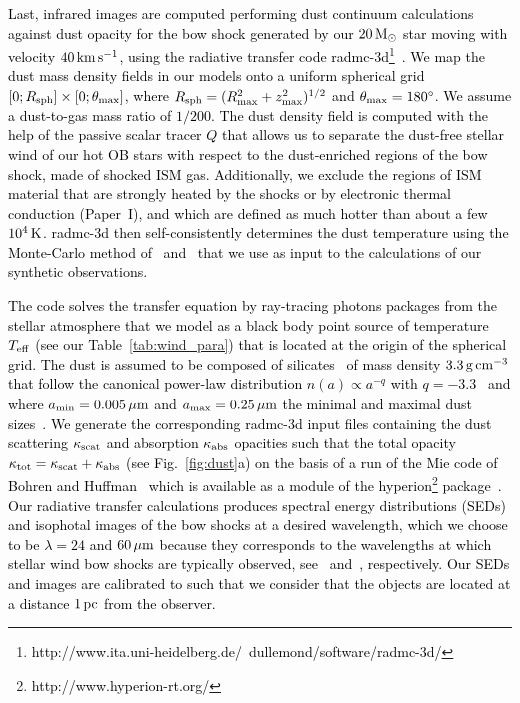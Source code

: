 \documentclass[useAMS,usenatbib]{mn2e}
\newcommand{\degree}{\ensuremath{^\circ}}
\begin{document}
\textcolor{black}{
Last, infrared images are computed performing dust continuum calculations 
against dust opacity for the bow shock generated by our $20\, \rm M_{\odot}$ 
star moving with velocity $40\, \rm km\, \rm s^{-1}$,  using 
the radiative transfer code {\sc radmc-3d}\footnote{ 
\textcolor{black}{http://www.ita.uni-heidelberg.de/~dullemond/software/radmc-3d/} 
}~\citep{ dullemond_2012}. We map the dust mass density fields in our models 
onto a uniform spherical grid $[0;R_{\rm sph}]\times[0; \theta_{\rm max}]$, 
where $R_{\rm sph}=(R_{\rm max}^{2}+z_{\rm max}^{2})^{1/2}$ and $\theta_{\rm 
max}=180\degree$. We assume a dust-to-gas mass ratio of $1/200$. The 
dust density field is computed with the help of the passive 
scalar tracer $Q$ that allows us to separate the dust-free stellar wind of our 
hot OB stars with respect to the dust-enriched regions of the bow shock, made of 
shocked ISM gas. Additionally, we 
exclude the regions of ISM material that are strongly heated by the shocks 
or by electronic thermal conduction (Paper~I), and which are defined as much hotter 
than about a few $10^{4}\, \rm K$. {\sc radmc-3d} then self-consistently 
determines the dust temperature using the Monte-Carlo 
method of~\citet{bjorkman_paj_554_2001} and~\citet{lucy_aa_344_1999} that we use 
as input to the calculations of our synthetic observations.
}




\textcolor{black}{
The code solves the transfer equation by ray-tracing photons packages from the
stellar atmosphere that we model as a black body point source of temperature
$T_{\rm eff}$ (see our Table~\ref{tab:wind_para}) that is located at the origin of
the spherical grid. The dust is assumed to be composed of
silicates~\citep{draine_apj_285_1984} of mass density $3.3\, \rm g\, \rm
cm^{-3}$ that follow the canonical power-law distribution $n(a)\propto a^{-q}$
with $q=-3.3$~\citep{mathis_apj_217_1977} and where $a_{\rm min}=0.005\, \mu \rm m$
and $a_{\rm max}=0.25\, \mu \rm m$ the minimal and maximal dust
sizes~\citep{vanmarle_apj_734_2011}.  We generate the corresponding {\sc
radmc-3d} input files containing the dust scattering $\kappa_{\rm scat}$ and
absorption $\kappa_{\rm abs}$ opacities such that the total opacity $\kappa_{\rm
tot}=\kappa_{\rm scat}+\kappa_{\rm abs}$ (see Fig.~\ref{fig:dust}a) on the basis
of a run of the Mie code of Bohren and Huffman~\citep{bohren_book_1983} which is
available as a module of the {\sc
hyperion}\footnote{\textcolor{black}{http://www.hyperion-rt.org/}}
package~\citep{robitaille_aa_536_2011}. Our radiative transfer calculations 
produces spectral energy distributions (SEDs) and isophotal images of the bow
shocks at a desired wavelength, which we choose to be $\lambda=24$ and $60\, \mu
\rm m$ because they corresponds to the wavelengths at which stellar wind bow
shocks are typically observed, see~\citet{sexton_mnras_446_2015}
and~\citet{buren_apj_329_1988,vanburen_aj_110_1995, noriegacrespo_aj_113_1997},
respectively. Our SEDs and images are calibrated to such that we 
consider that the objects are located at a distance $1\, \rm pc$ from 
the observer. 
}
\end{document}
